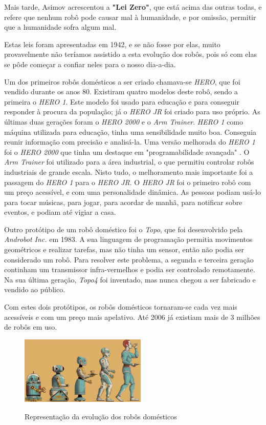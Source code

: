 \documentclass[10pt]{article}
\begin{document}
Mais tarde, Asimov acrescentou a \textbf{"Lei Zero"}, que está acima das outras todas, e refere que nenhum robô pode causar mal à humanidade, e por omissão, permitir que a humanidade sofra algum mal.

Estas leis foram apresentadas em 1942, e se não fosse por elas, muito provavelmente não teríamos assistido a esta evolução dos robôs, pois só com elas se pôde começar a confiar neles para o nosso dia-a-dia.

Um dos primeiros robôs domésticos a ser criado chamava-se \textit{HERO}, que foi vendido durante os anos 80. Existiram quatro modelos deste robô, sendo a primeira o \textit{HERO 1}. Este modelo foi usado para educação e para conseguir responder à procura da população; já o \textit{HERO JR} foi criado para uso próprio. As últimas duas gerações foram o \textit{HERO 2000} e o \textit{Arm Trainer}. \textit{HERO 1} como máquina utilizada para educação, tinha uma sensibilidade muito boa. Conseguia reunir informação com precisão e analisá-la. Uma versão melhorada do \textit{HERO 1} foi o \textit{HERO 2000} que tinha um destaque em "programabilidade avançada" \cite{history}. O \textit{Arm Trainer} foi utilizado para a área industrial, o que permitiu controlar robôs industriais de grande escala. Nisto tudo, o melhoramento mais importante foi a passagem do \textit{HERO 1} para o \textit{HERO JR}. O \textit{HERO JR} foi o primeiro robô com um preço acessível, e com uma personalidade dinâmica. As pessoas podiam usá-lo para tocar músicas, para jogar, para acordar de manhã, para notificar sobre eventos, e podiam até vigiar a casa.

Outro protótipo de um robô doméstico foi o \textit{Topo}, que foi desenvolvido pela \textit{Androbot Inc.} em 1983. A sua linguagem de programação permitia movimentos geométricos e realizar tarefas, mas não tinha um sensor, então não podia ser considerado um robô. Para resolver este problema, a segunda e terceira geração continham um transmissor infra-vermelhos e podia ser controlado remotamente. Na sua última geração, \textit{Topo4} foi inventado, mas nunca chegou a ser fabricado e vendido ao público.

Com estes dois protótipos, os robôs domésticos tornaram-se cada vez mais acessíveis e com um preço mais apelativo. Até 2006 já existiam mais de 3 milhões de robôs em uso.

\begin{figure}[h]
\caption{Representação da evolução dos robôs domésticos}
\centering
\includegraphics[width = 6cm]{img/3.png}
\label{figura:3}
\end{figure}
\end{document}
